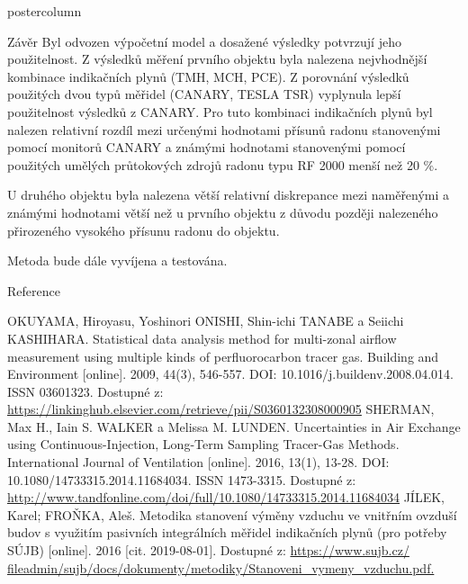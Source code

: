 \documentclass{beamer}
\begin{document}
\begin{frame}
\begin{columns}
\begin{column}{.57\textwidth}
\begin{beamercolorbox}[center]{postercolumn}
\begin{minipage}{.98\textwidth}
{\begin{myblock}{Závěr}
    Byl odvozen výpočetní model a dosažené výsledky potvrzují jeho použitelnost. Z výsledků měření prvního objektu byla nalezena nejvhodnější kombinace indikačních plynů (TMH, MCH, PCE). Z porovnání výsledků použitých dvou typů měřidel (CANARY, TESLA TSR) vyplynula lepší použitelnost výsledků z CANARY. Pro tuto kombinaci indikačních plynů byl nalezen relativní rozdíl mezi určenými hodnotami přísunů radonu stanovenými pomocí monitorů CANARY a známými hodnotami stanovenými pomocí použitých umělých průtokových zdrojů radonu typu RF 2000 menší než 20 \%.

U druhého objektu byla nalezena větší relativní diskrepance mezi naměřenými a známými hodnotami větší než u prvního objektu z důvodu později nalezeného přirozeného vysokého přísunu radonu do objektu.

Metoda bude dále vyvíjena a testována.
\end{myblock}
\vfill
\begin{myblock}{Reference}
    \footnotesize
    \tiny
    \begin{thebibliography}{Mn99}
                                 OKUYAMA, Hiroyasu, Yoshinori ONISHI, Shin-ichi TANABE a Seiichi KASHIHARA. Statistical data analysis method for multi-zonal airflow measurement using multiple kinds of perfluorocarbon tracer gas. Building and Environment [online]. 2009, 44(3), 546-557. DOI: 10.1016/j.buildenv.2008.04.014. ISSN 03601323. Dostupné z: \url{https://linkinghub.elsevier.com/retrieve/pii/S0360132308000905} 
                                 SHERMAN, Max H., Iain S. WALKER a Melissa M. LUNDEN. Uncertainties in Air Exchange using Continuous-Injection, Long-Term Sampling Tracer-Gas Methods. International Journal of Ventilation [online]. 2016, 13(1), 13-28. DOI: 10.1080/14733315.2014.11684034. ISSN 1473-3315. Dostupné z: \url{http://www.tandfonline.com/doi/full/10.1080/14733315.2014.11684034}
                                 JÍLEK, Karel; FROŇKA, Aleš. Metodika stanovení výměny vzduchu ve vnitřním ovzduší budov s využitím pasivních integrálních měřidel indikačních plynů (pro potřeby SÚJB) [online]. 2016 [cit. 2019-08-01]. Dostupné z: \url{https://www.sujb.cz/
fileadmin/sujb/docs/dokumenty/metodiky/Stanoveni_vymeny_vzduchu.pdf.}
                        \end{thebibliography}
                    \end{myblock}\vfill
		}\end{minipage}\end{beamercolorbox}
	\end{column}
\end{columns}


\end{frame}
\end{document}
